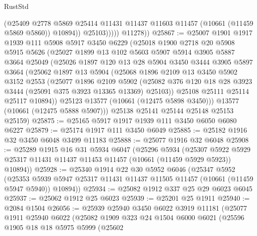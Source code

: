 \begin{lexlean}{RustStd}
\begin{coremodule}
                    (@25409
                      @2778
                      @5869
                      @25414
                      @11431
                      @11437
                      @11603
                      @11457
                      (@10661 (@11459 @5869 @5860))
                      @10894))
                  @25103)))))
        @11278))
@25867 := @25007
    @1901
    @1917
    @1939
    @111
    @5908
    @5917
    @3450
    @6229
    (@25018
      @1900
      @2718
      @20
      @5908
      @5915
      @5626
      (@25027
        @1899
        @13
        @102
        @5603
        @5907
        @5914
        @3905
        @5887
        @3664
        @25049
        (@25026
          @1897
          @120
          @13
          @28
          @5904
          @3450
          @3444
          @3905
          @5897
          @3664
          (@25062
            @1897
            @13
            @5904
            (@25068
              @1896
              @2109
              @13
              @3450
              @5902
              @3152
              @2553
              (@25077
                @1896
                @2109
                @5902
                (@25082 @376 @120 @18 @28 @3923 @3444 (@25091 @375 @3923 @13365 @13369) @25103))
              @25108
              @25111
              @25114
              @25117
              @10894))
          @25123
          @13577
          (@10661 (@12475 @5898 @3450)))
        @13577
        (@10661 (@12475 @5888 @5907)))
      @25138
      @25141
      @25144
      @25148
      @25153
      @25159)
@25875 := @25165 @5917 @1917 @1939 @111 @3450 @6050 @6080 @6227
@25879 := @25174 @1917 @111 @3450 @6049
@25885 := @25182 @1916 @32 @3450 @6048 @3499 @11183
@25888 := @25077 @1916 @32 @6048
@25908 := @25289
    @1915
    @16
    @31
    @5934
    @6047
    (@25296
      @5934
      (@25307 @5922 @5929 @25317 @11431 @11437 @11453 @11457 (@10661 (@11459 @5929 @5923)) @10894))
@25928 := @25340
    @1914
    @22
    @30
    @5952
    @6046
    (@25347
      @5952
      (@25353 @5939 @5947 @25317 @11431 @11437 @11505 @11457 (@10661 (@11459 @5947 @5940)) @10894))
@25934 := @25082 @1912 @337 @25 @29 @6023 @6045
@25937 := @25062 @1912 @25 @6023
@25939 := @25201 @25 @1911
@25940 := @2084 @1504
@26056 := @25939
    @25940
    @3450
    @6022
    @3919
    @11181
    (@25077
      @1911
      @25940
      @6022
      (@25082
        @1909
        @323
        @24
        @1504
        @6000
        @6021
        (@25596
          @1905
          @18
          @18
          @5975
          @5999
          (@25602

\end{coremodule}
\end{lexlean}
